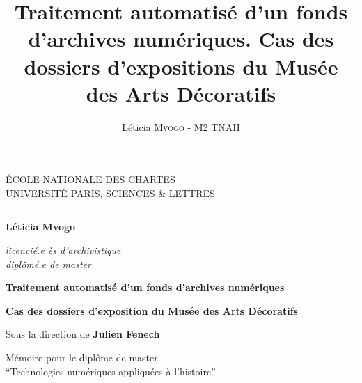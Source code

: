 \documentclass[12pt,twoside]{book}
\author{Léticia \textsc{Mvogo} - M2 TNAH}
\title{Traitement automatisé d'un fonds d'archives numériques. Cas des dossiers d'expositions du Musée des Arts Décoratifs}
\begin{document}
	\begin{titlepage}
		\begin{center}
			
			\bigskip
			
			\begin{large}				
				ÉCOLE NATIONALE DES CHARTES\\
				UNIVERSITÉ PARIS, SCIENCES \& LETTRES
			\end{large}
			\begin{center}\rule{2cm}{0.02cm}\end{center}
			
			\bigskip
			\bigskip
			\bigskip
			\begin{Large}
				\textbf{Léticia Mvogo}\\
			\end{Large}
			\begin{normalsize} \textit{licencié.e ès d'archivistique }\\
				\textit{diplômé.e de master}
			\end{normalsize}
			
			\bigskip
			\bigskip
			\bigskip
			
			\begin{Huge}
				\textbf{Traitement automatisé d'un fonds d'archives numériques }\\
			\end{Huge}
			\bigskip
			\bigskip
			\begin{LARGE}
				\textbf{Cas des dossiers d'exposition du Musée des Arts Décoratifs}\\
			\end{LARGE}
			
			\bigskip
			\bigskip
			\bigskip
			\begin{large}
				Sous la direction de \textbf{Julien Fenech}
			\end{large}
			\vfill
			
			\begin{large}
				Mémoire 
				pour le diplôme de master \\
				\enquote{Technologies numériques appliquées à l'histoire} \\
			\end{large}
			
		\end{center}
	\end{titlepage}

	\thispagestyle{empty}	
	\cleardoublepage
	
\frontmatter
\end{document}
